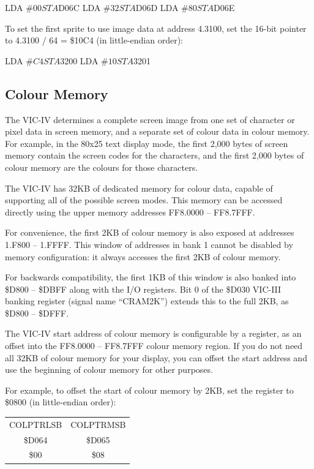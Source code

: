 \begin{asmcode}
LDA #$00
STA $D06C
LDA #$32
STA $D06D
LDA #$80
STA $D06E
\end{asmcode}

To set the first sprite to use image data at address 4.3100, set the 16-bit pointer to 4.3100 / 64 = \$10C4 (in little-endian order):

\begin{asmcode}
LDA #$C4
STA $3200
LDA #$10
STA $3201
\end{asmcode}

\subsection{Colour Memory}

The VIC-IV determines a complete screen image from one set of character or pixel data in screen memory, and a separate set of colour data in colour memory. For example, in the 80x25 text display mode, the first 2,000 bytes of screen memory contain the screen codes for the characters, and the first 2,000 bytes of colour memory are the colours for those characters.

The VIC-IV has 32KB of dedicated memory for colour data, capable of supporting all of the possible screen modes. This memory can be accessed directly using the upper memory addresses FF8.0000 -- FF8.7FFF.

For convenience, the first 2KB of colour memory is also exposed at addresses 1.F800 -- 1.FFFF. This window of addresses in bank 1 cannot be disabled by memory configuration: it always accesses the first 2KB of colour memory.

For backwards compatibility, the first 1KB of this window is also banked into \$D800 -- \$DBFF along with the I/O registers. Bit 0 of the \$D030 VIC-III banking register (signal name ``CRAM2K'') extends this to the full 2KB, as \$D800 -- \$DFFF.

The VIC-IV start address of colour memory is configurable by a register, as an offset into the FF8.0000 -- FF8.7FFF colour memory region. If you do not need all 32KB of colour memory for your display, you can offset the start address and use the beginning of colour memory for other purposes.

For example, to offset the start of colour memory by 2KB, set the register to \$0800 (in little-endian order):

\begin{center}
\begin{tabular}{|c|c|}
\hline
COLPTRLSB & COLPTRMSB \\
\$D064 & \$D065 \\
\hline
\$00 & \$08 \\
\hline
\end{tabular}
\end{center}

